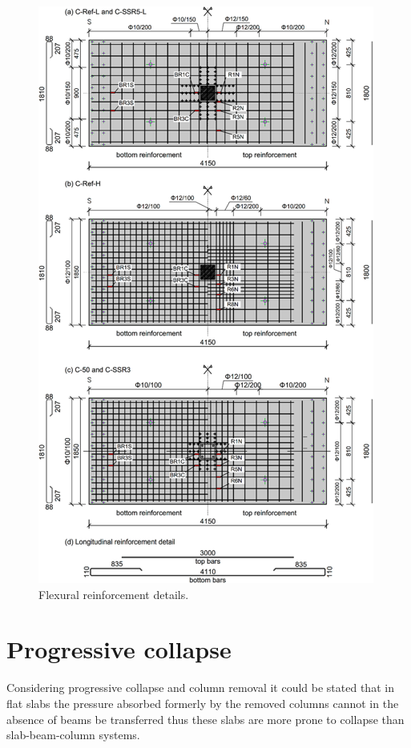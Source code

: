 \documentclass[twocolumn]{article} %
\begin{document}
\begin{figure}\centering
    \includegraphics[width=\columnwidth]{Figures/i2021f1.png}
    \caption{Flexural reinforcement details\citep{isufi2021}.}
    \label{i2021f1}
    \end{figure}
\section{Progressive collapse}
Considering progressive collapse and column removal it could be stated that in flat slabs the pressure absorbed formerly by the removed columns cannot in the absence of beams be transferred thus these slabs are more prone to collapse than slab-beam-column systems\citep{Singh2023}. 
\end{document}
